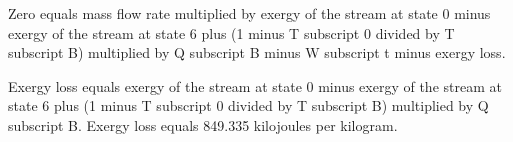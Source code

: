 Zero equals mass flow rate multiplied by exergy of the stream at state 0 minus exergy of the stream at state 6 plus (1 minus T subscript 0 divided by T subscript B) multiplied by Q subscript B minus W subscript t minus exergy loss.  

Exergy loss equals exergy of the stream at state 0 minus exergy of the stream at state 6 plus (1 minus T subscript 0 divided by T subscript B) multiplied by Q subscript B.  
Exergy loss equals 849.335 kilojoules per kilogram.